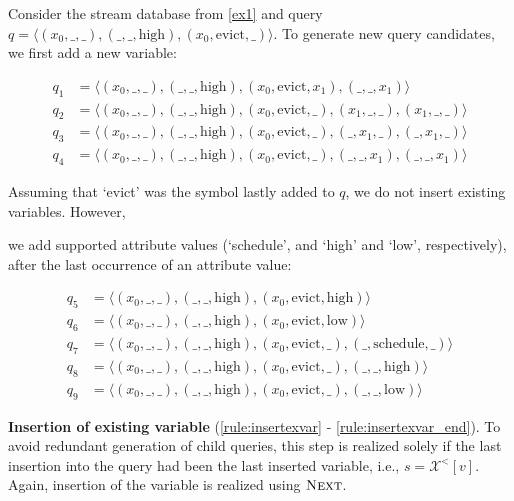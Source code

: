 \begin{example}
	\label{ex:children}
	Consider the stream database from \autoref{ex1} and query
	$q = \langle (x_0,\_,\_),(\_,\_,\text{high}),(x_0,\text{evict},\_)
	\rangle$.
	To generate new query candidates, we first add a new variable:

	\vspace{-1.8em}
	\begin{align*}
		q_1 &= \langle
		(x_0,\_,\_),(\_,\_,\text{high}),(x_0,\text{evict},x_1),(\_,\_,x_1)
		\rangle \\
		q_2 &= \langle
		(x_0,\_,\_),(\_,\_,\text{high}),(x_0,\text{evict},\_),(x_1,\_,\_),
		(x_1,\_,\_)\rangle \\
		q_3 &= \langle
		(x_0,\_,\_),(\_,\_,\text{high}),(x_0,\text{evict},\_),(\_,x_1,\_),
		(\_,x_1,\_)\rangle \\
		q_4 &= \langle
		(x_0,\_,\_),(\_,\_,\text{high}),(x_0,\text{evict},\_),(\_,\_,x_1),
		(\_,\_,x_1)\rangle
	\end{align*}

	\vspace{-.4em}
	\noindent
	Assuming that `evict' was the symbol lastly added to $q$, we do not
	insert existing variables. However, 	
	
	we add supported attribute values (`schedule', and `high' and `low',
	respectively), after the last occurrence of an attribute value:
	

	\vspace{-1.8em}
	\begin{align*}
		q_5 &= \langle
		(x_0,\_,\_),(\_,\_,\text{high}),(x_0,\text{evict},\text{high})
		\rangle \\
		q_6 &= \langle
		(x_0,\_,\_),(\_,\_,\text{high}),(x_0,\text{evict},\text{low})
		\rangle \\
		q_7 &= \langle (x_0,\_,\_),(\_,\_,\text{high}),(x_0,\text{evict},\_)
		,(\_,\text{schedule},\_)\rangle \\
		q_8 &= \langle (x_0,\_,\_),(\_,\_,\text{high}),(x_0,\text{evict},\_)
		,(\_,\_,\text{high})\rangle \\
		q_9 &= \langle (x_0,\_,\_),(\_,\_,\text{high}),(x_0,\text{evict},\_)
		,(\_,\_,\text{low})\rangle
	\end{align*}
\end{example}


\textbf{Insertion of existing variable} (\autoref{rule:insertexvar} -
\ref{rule:insertexvar_end}). To avoid redundant generation of child
queries, this step is realized solely if the last insertion into the query
had been the last inserted variable, i.e., $s=\mathcal{X}^<[v]$. Again,
insertion of the variable is realized using $\textsc{Next}$.


